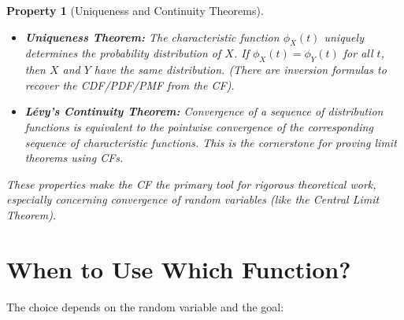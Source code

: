 \documentclass[11pt, letterpaper]{article}
\newtheorem{property}[theorem]{Property}
\begin{document}
\begin{property}[Uniqueness and Continuity Theorems]
\begin{itemize}
    \item \textbf{Uniqueness Theorem:} The characteristic function $\phi_X(t)$ uniquely determines the probability distribution of $X$. If $\phi_X(t) = \phi_Y(t)$ for all $t$, then $X$ and $Y$ have the same distribution. (There are inversion formulas to recover the CDF/PDF/PMF from the CF).
    \item \textbf{Lévy's Continuity Theorem:} Convergence of a sequence of distribution functions is equivalent to the pointwise convergence of the corresponding sequence of characteristic functions. This is the cornerstone for proving limit theorems using CFs.
\end{itemize}
These properties make the CF the primary tool for rigorous theoretical work, especially concerning convergence of random variables (like the Central Limit Theorem).
\end{property}

\section{When to Use Which Function?}

The choice depends on the random variable and the goal:
\end{document}
